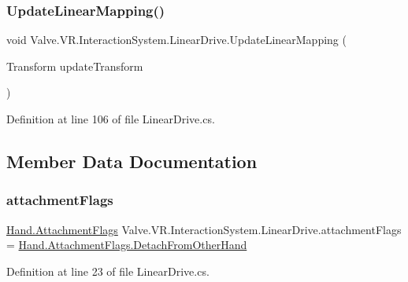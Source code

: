 \subsubsection{\texorpdfstring{UpdateLinearMapping()}{UpdateLinearMapping()}}
{\footnotesize\ttfamily void Valve.\+V\+R.\+Interaction\+System.\+Linear\+Drive.\+Update\+Linear\+Mapping (\begin{DoxyParamCaption}\item[{Transform}]{update\+Transform }\end{DoxyParamCaption})\hspace{0.3cm}{\ttfamily [protected]}}



Definition at line 106 of file Linear\+Drive.\+cs.



\subsection{Member Data Documentation}
\mbox{\label{class_valve_1_1_v_r_1_1_interaction_system_1_1_linear_drive_a6ade301020a7164c3a16d88d90080af5}} 
\subsubsection{\texorpdfstring{attachmentFlags}{attachmentFlags}}
{\footnotesize\ttfamily \mbox{\hyperlink{class_valve_1_1_v_r_1_1_interaction_system_1_1_hand_a61701f82b8f3fac8818954ec71804cb5}{Hand.\+Attachment\+Flags}} Valve.\+V\+R.\+Interaction\+System.\+Linear\+Drive.\+attachment\+Flags = \mbox{\hyperlink{class_valve_1_1_v_r_1_1_interaction_system_1_1_hand_a61701f82b8f3fac8818954ec71804cb5a8a58e6540a6a37ae53f78af6e282acb2}{Hand.\+Attachment\+Flags.\+Detach\+From\+Other\+Hand}}\hspace{0.3cm}{\ttfamily [protected]}}



Definition at line 23 of file Linear\+Drive.\+cs.

\mbox{\label{class_valve_1_1_v_r_1_1_interaction_system_1_1_linear_drive_a20ea9b3f558f3b5121a22bafb3926712}} 
